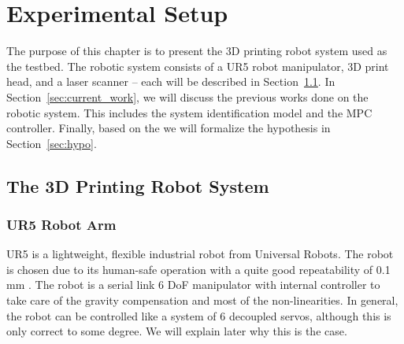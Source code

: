 \chapter{Experimental Setup} \label{chap:testbed}

The purpose of this chapter is to present the 3D printing robot system used as the testbed. The robotic system consists of a UR5 robot manipulator, 3D print head, and a laser scanner -- each will be described in Section~\ref{sec:ur5}. In Section~\ref{sec:current_work}, we will discuss the previous works done on the robotic system. This includes the system identification model and the \ac {MPC} controller. Finally, based on the we will formalize the hypothesis in Section~\ref{sec:hypo}.
\section{The 3D Printing Robot System} \label{sec:ur5}
\subsection{UR5 Robot Arm}
UR5 is a lightweight, flexible industrial robot from Universal Robots. The robot is chosen due to its human-safe operation with a quite good repeatability of 0.1 mm \cite{UR5}. The robot is a serial link 6 \ac{DoF} manipulator with internal controller to take care of the gravity compensation and most of the non-linearities. In general, the robot can be controlled like a system of 6 decoupled servos, although this is only correct to some degree. We will explain later why this is the case.

